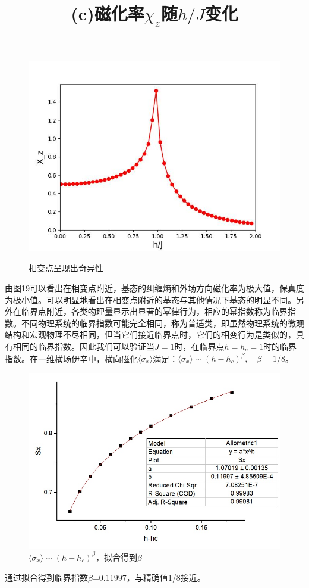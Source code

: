 \documentclass[12pt]{article}
\begin{document}
\begin{figure}[H]
           	
      \begin{minipage}{0.49\linewidth}
      	\centering
      	\includegraphics[width=1\linewidth, height=240pt]{tfi_tran4}
      	\title{(c)磁化率$\chi_z$随$h/J$变化}
      	\label{fig:31}
      \end{minipage}
       
      	\caption[9pt]{相变点呈现出奇异性}
      \end{figure}
  
  由图19可以看出在相变点附近，基态的纠缠熵和外场方向磁化率为极大值，保真度为极小值。可以明显地看出在相变点附近的基态与其他情况下基态的明显不同。另外在临界点附近，各类物理量显示出显著的幂律行为，相应的幂指数称为临界指数。不同物理系统的临界指数可能完全相同，称为普适类，即虽然物理系统的微观结构和宏观物理不尽相同，但当它们接近临界点时，它们的相变行为是类似的，具有相同的临界指数。因此我们可以验证当$J=1$时，在临界点$h=h_c=1$时的临界指数。在一维横场伊辛中，横向磁化$\langle\sigma_x\rangle$满足：$\langle\sigma_x\rangle\sim(h-h_c)^\beta, \quad \beta=1/8$。
  
  
   \begin{figure}[H]
   	\centering
   	\includegraphics[scale=0.7]{tfi_tran3}
   	\caption[9pt]{$\langle\sigma_x\rangle\sim(h-h_c)^\beta$，拟合得到$\beta$}
   \end{figure}
   通过拟合得到临界指数$\beta$=0.11997，与精确值1/8接近。
   
\end{document}
